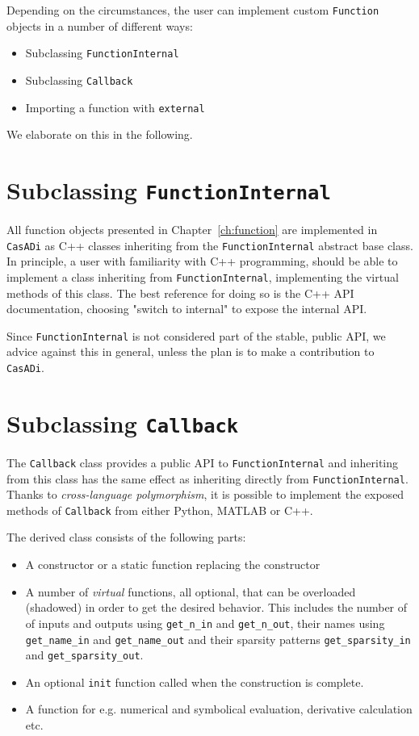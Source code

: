 \documentclass[a4paper,12pt]{book}
\newcommand{\CasADi}{\texttt{CasADi}\xspace}
\begin{document}
Depending on the circumstances, the user can implement custom \texttt{Function}
objects in a number of different ways:

\begin{itemize}
\item Subclassing \texttt{FunctionInternal}
\item Subclassing \texttt{Callback}
\item Importing a function with \texttt{external}
\end{itemize}

We elaborate on this in the following.
\section{Subclassing \texttt{FunctionInternal}}
All function objects presented in Chapter~\ref{ch:function} are implemented
in \CasADi as C++ classes inheriting from the \texttt{FunctionInternal} abstract
base class. In principle, a user with familiarity with C++ programming, should
be able to implement a class inheriting from \texttt{FunctionInternal},
implementing the virtual methods of this class. The best reference for doing so
is the C++ API documentation, choosing "switch to internal" to expose the internal
API.

Since \texttt{FunctionInternal} is not considered part of the stable, public API,
we advice against this in general, unless the plan is to make a contribution to \CasADi.

\section{Subclassing \texttt{Callback}}
The \texttt{Callback} class provides a public API to \texttt{FunctionInternal}
and inheriting from this class has the same effect as inheriting directly from
\texttt{FunctionInternal}. Thanks to \emph{cross-language polymorphism}, it
is possible to implement the exposed methods of \texttt{Callback} from either
Python, MATLAB or C++.

The derived class consists of the following parts:
\begin{itemize}
  \item A constructor or a static function replacing the constructor
  \item A number of \emph{virtual} functions, all optional, that can be overloaded
  (shadowed) in order to get the desired behavior. This includes the number of
  of inputs and outputs using \verb|get_n_in| and \verb|get_n_out|,
  their names using \verb|get_name_in| and \verb|get_name_out|
  and their sparsity patterns \verb|get_sparsity_in| and \verb|get_sparsity_out|.
  \item An optional \verb|init| function called when the construction is complete.
  \item A function for e.g. numerical and symbolical evaluation, derivative
  calculation etc.
\end{itemize}
\end{document}

